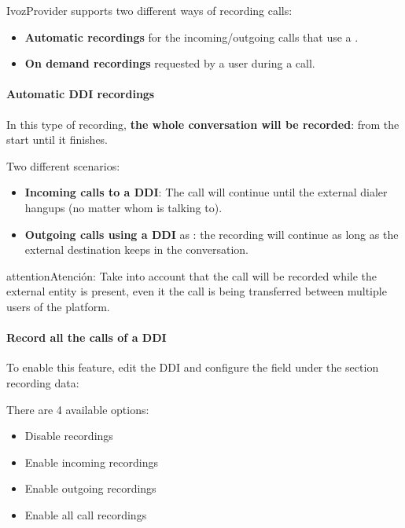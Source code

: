 \documentclass[letterpaper,10pt,spanish]{sphinxmanual}
\begin{document}
IvozProvider supports two different ways of recording calls:
\begin{itemize}
\item {} 
\textbf{Automatic recordings} for the incoming/outgoing calls that use a
{\hyperref[administration_portal/brand/views/ddis:ddis]{}}.

\item {} 
\textbf{On demand recordings} requested by a user during a call.

\end{itemize}


\paragraph{Automatic DDI recordings}
\label{administration_portal/client/vpbx/calls/call_recordings:automatic-ddi-recordings}
In this type of recording, \textbf{the whole conversation will be recorded}: from
the start until it finishes.

Two different scenarios:
\begin{itemize}
\item {} 
\textbf{Incoming calls to a DDI}: The call will continue until the external
dialer hangups (no matter whom is talking to).

\item {} 
\textbf{Outgoing calls using a DDI} as {\hyperref[administration_portal/brand/views/ddis:ddis]{}}: the
recording will continue as long as the external destination keeps in the
conversation.

\end{itemize}

\begin{notice}{attention}{Atención:}
Take into account that the call will be recorded while the
external entity is present, even it the call is being transferred between
multiple users of the platform.
\end{notice}
\paragraph{Record all the calls of a DDI}

To enable this feature, edit the DDI and configure the field under the section
recording data:

There are 4 available options:
\begin{itemize}
\item {} 
Disable recordings

\item {} 
Enable incoming recordings

\item {} 
Enable outgoing recordings

\item {} 
Enable all call recordings

\end{itemize}
\end{document}
